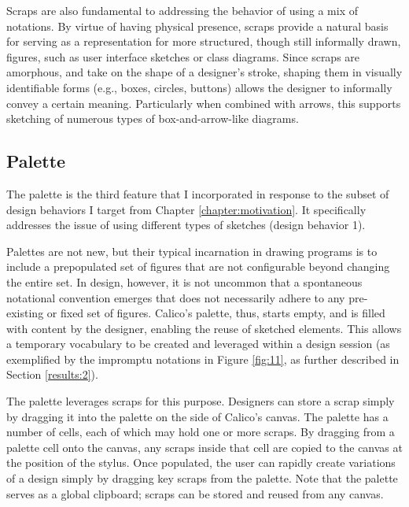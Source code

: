 \documentclass[12pt,fleqn]{ucithesis}
\begin{document}
Scraps are also fundamental to addressing the behavior of using a mix of notations. By virtue of having physical presence, scraps provide a natural basis for serving as a representation for more structured, though still informally drawn, figures, such as user interface sketches or class diagrams. Since scraps are amorphous, and take on the shape of a designer's stroke, shaping them in visually identifiable forms (e.g., boxes, circles, buttons) allows the designer to informally convey a certain meaning. Particularly when combined with arrows, this supports sketching of numerous types of box-and-arrow-like diagrams. 

\subsection {Palette}
\label{calico:4}

The palette is the third feature that I incorporated in response to the subset of design behaviors I target from Chapter \ref{chapter:motivation}. It specifically addresses the issue of using different types of sketches (design behavior 1).

Palettes are not new, but their typical incarnation in drawing programs is to include a prepopulated set of figures that are not configurable beyond changing the entire set. In design, however, it is not uncommon that a spontaneous notational convention emerges that does not necessarily adhere to any pre-existing or fixed set of figures. Calico's palette, thus, starts empty, and is filled with content by the designer, enabling the reuse of sketched elements. This allows a temporary vocabulary to be created and leveraged within a design session (as exemplified by the impromptu notations in Figure \ref{fig:11}, as further described in Section \ref{results:2}). 


%

The palette leverages scraps for this purpose. Designers can store a scrap simply by dragging it into the palette on the side of Calico's canvas. The palette has a number of cells, each of which may hold one or more scraps. By dragging from a palette cell onto the canvas, any scraps inside that cell are copied to the canvas at the position of the stylus. Once populated, the user can rapidly create variations of a design simply by dragging key scraps from the palette.
Note that the palette serves as a global clipboard; scraps can be stored and reused from any canvas. 
\end{document}
